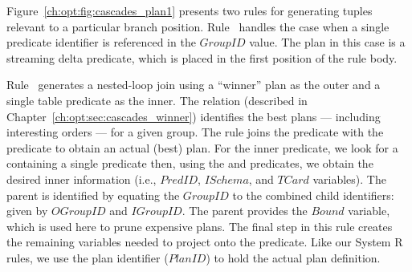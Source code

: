 Figure~\ref{ch:opt:fig:cascades_plan1} presents two rules for generating
 tuples relevant to a particular branch position.  Rule~
handles the case when a single predicate identifier is referenced in the
$GroupID$ value.  The plan in this case is a streaming delta predicate, which
is placed in the first position of the rule body.

Rule~ generates a nested-loop join  using a ``winner'' plan as
the outer and a single table predicate as the inner.  The  relation
(described in Chapter~\ref{ch:opt:sec:cascades_winner}) identifies the best
plans --- including interesting orders --- for a given group.  The rule joins
the  predicate with the  predicate to obtain an actual
(best) plan.  For the inner predicate, we look for a  containing a
single predicate then, using the  and 
predicates, we obtain the desired inner information (i.e., $PredID$, $ISchema$,
and $TCard$ variables).  The parent  is identified by equating the
$GroupID$ to the combined child identifiers: given by $OGroupID$ and
$IGroupID$.  The parent  provides the $Bound$ variable, which is
used here to prune expensive plans.  The final step in this rule creates the
remaining variables needed to project onto the  predicate.  Like our
System R rules, we use the plan identifier ($PlanID$) to hold the actual plan
definition.

